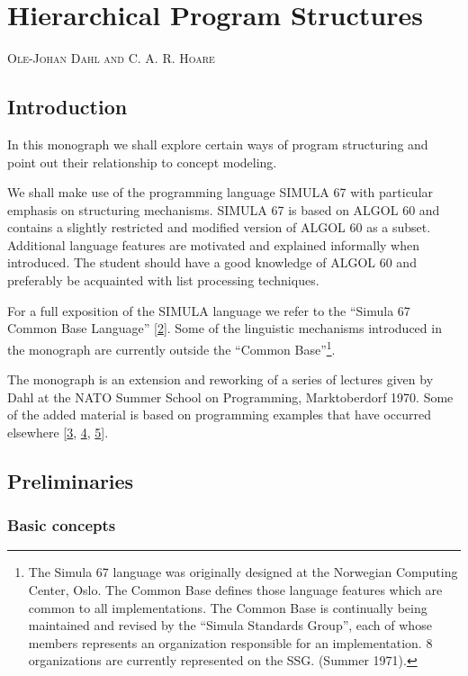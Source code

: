 \chapter{Hierarchical Program Structures}

{
	\noindent
	\scshape\hfill\scriptsize Ole-Johan Dahl and C. A. R. Hoare\hfill
}
\renewcommand{\leftmark}{\normalfont\scriptsize\hfill OLE-JOHAN DAHL AND C. A. R. HOARE\hfill}
\medskip

\section{Introduction}

In this monograph we shall explore certain ways of program structuring and point out their relationship to concept modeling.

We shall make use of the programming language SIMULA 67 with particular emphasis on structuring mechanisms. SIMULA 67 is based on ALGOL 60 and contains a slightly restricted and modified version of ALGOL 60 as a subset. Additional language features are motivated and explained informally when introduced. The student should have a good knowledge of ALGOL 60 and preferably be acquainted with list processing techniques.

For a full exposition of the SIMULA language we refer to the ``Simula 67 Common Base Language'' [\hyperref[ref:2]{2}]. Some of the linguistic mechanisms introduced in the monograph are currently outside the ``Common Base''\footnote{The Simula 67 language was originally designed at the Norwegian Computing Center, Oslo. The Common Base defines those language features which are common to all implementations. The Common Base is continually being maintained and revised by the ``Simula Standards Group'', each of whose members represents an organization responsible for an implementation. 8 organizations are currently represented on the SSG. (Summer 1971).}.

The monograph is an extension and reworking of a series of lectures given by Dahl at the NATO Summer School on Programming, Marktoberdorf 1970. Some of the added material is based on programming examples that have occurred elsewhere [\hyperref[ref:3]{3}, \hyperref[ref:4]{4}, \hyperref[ref:5]{5}].

\section{Preliminaries}

\subsection{Basic concepts}


